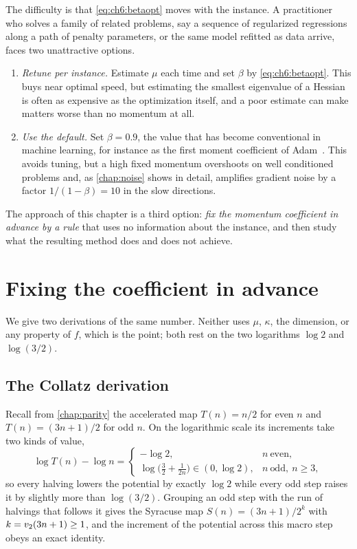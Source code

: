 The difficulty is that \eqref{eq:ch6:betaopt} moves with the instance. A
practitioner who solves a family of related problems, say a sequence of
regularized regressions along a path of penalty parameters, or the same model
refitted as data arrive, faces two unattractive options.
\begin{enumerate}[leftmargin=2em]
  \item \emph{Retune per instance.} Estimate $\mu$ each time and set $\beta$ by
  \eqref{eq:ch6:betaopt}. This buys near optimal speed, but estimating the
  smallest eigenvalue of a Hessian is often as expensive as the optimization
  itself, and a poor estimate can make matters worse than no momentum at all.
  \item \emph{Use the default.} Set $\beta=0.9$, the value that has become
  conventional in machine learning, for instance as the first moment
  coefficient of Adam~\cite{kingma2015}. This avoids tuning, but a high fixed
  momentum overshoots on well conditioned problems and, as
  \cref{chap:noise} shows in detail, amplifies gradient noise by a factor
  $1/(1-\beta)=10$ in the slow directions.
\end{enumerate}
The approach of this chapter is a third option: \emph{fix the momentum coefficient in advance by a rule} that uses no information about the instance, and then study what the resulting method does and does not achieve.

\section{Fixing the coefficient in advance}\label{sec:ch6:beta}

We give two derivations of the same number. Neither uses $\mu$, $\kappa$, the dimension, or any property of $f$, which is the point; both rest on the two logarithms $\log2$ and $\log(3/2)$.

\subsection{The Collatz derivation}

Recall from \cref{chap:parity} the accelerated map $T(n)=n/2$ for even $n$ and
$T(n)=(3n+1)/2$ for odd $n$. On the logarithmic scale its increments take two
kinds of value,
\[
  \log T(n)-\log n=
  \begin{cases}
    -\log 2, & n\ \text{even},\\[2pt]
    \log\bigl(\tfrac32+\tfrac1{2n}\bigr)\in(0,\log 2), & n\ \text{odd},\ n\ge3,
  \end{cases}
\]
so every halving lowers the potential by exactly $\log 2$ while every odd step
raises it by slightly more than $\log(3/2)$. Grouping an odd step with the run
of halvings that follows it gives the Syracuse map $S(n)=(3n+1)/2^{k}$ with
$k=v_2(3n+1)\ge1$, and the increment of the potential across this macro step
obeys an exact identity.


